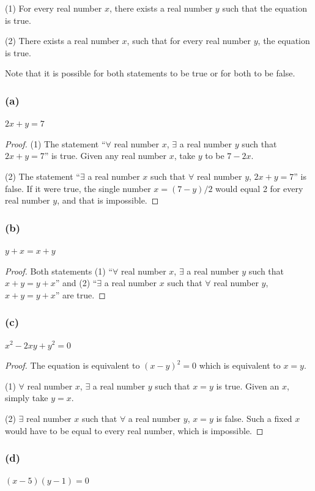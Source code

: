 \documentclass[14pt]{extarticle}
\newcommand{\fa}{\forall}
\newcommand{\te}{\exists}
\begin{document}
(1) For every real number $x$, there exists a real number $y$ such that the equation is true.

(2) There exists a real number $x$, such that for every real number $y$, the equation is true.

Note that it is possible for both statements to be true or for both to be false.

\subsubsection{(a)}
$2x + y = 7$

\begin{proof}
(1) The statement “$\fa$ real number $x$, $\te$ a real number $y$ such that $2x + y = 7$” is true. Given any real number $x$, take $y$ to be $7 - 2x$.

(2) The statement “$\te$ a real number $x$ such that $\fa$ real number $y$, $2x + y = 7$” is false. If it were true, the single number $x = (7 - y) / 2$ would equal 2 for every real number $y$, and that is impossible.
\end{proof}

\subsubsection{(b)}
$y + x = x + y$

\begin{proof}
Both statements (1) “$\fa$ real number $x$, $\te$ a real
number $y$ such that $x + y = y + x$” and (2) “$\te$ a real
number $x$ such that $\fa$ real number $y$, $x + y = y + x$” are true.
\end{proof}

\subsubsection{(c)}
$x^2 - 2xy + y^2 = 0$

\begin{proof}
The equation is equivalent to $(x - y)^2 = 0$ which is equivalent to $x = y$.

(1) $\fa$ real number $x$, $\te$ a real number $y$ such that $x = y$ is true. Given an $x$, simply take $y = x$.

(2) $\te$ real number $x$ such that $\fa$ a real number $y$, $x = y$ is false. Such a fixed $x$ would have to be equal to every real number, which is impossible.
\end{proof}

\subsubsection{(d)}
$(x - 5)(y - 1) = 0$
\end{document}
